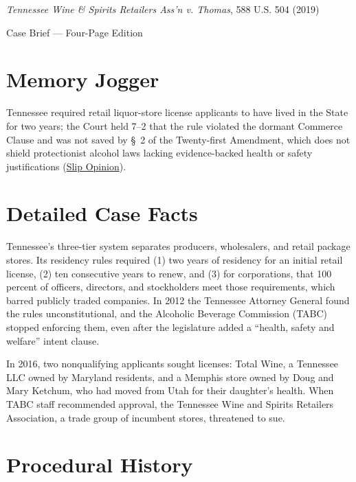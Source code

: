 \documentclass[12pt]{article}
\begin{document}
\begin{center}
{\LARGE \textit{Tennessee Wine \& Spirits Retailers Ass'n v. Thomas}, 588 U.S. 504 (2019)\par}
\vspace{0.8em}
{\large Case Brief --- Four-Page Edition\par}
\end{center}
\vspace{1em}

\section{Memory Jogger}

Tennessee required retail liquor-store license applicants to have lived in the State for two years; the Court held 7--2 that the rule violated the dormant Commerce Clause and was not saved by \S~2 of the Twenty-first Amendment, which does not shield protectionist alcohol laws lacking evidence-backed health or safety justifications (\href{https://www.supremecourt.gov/opinions/18pdf/18-96_5i36.pdf}{Slip Opinion}).

\section{Detailed Case Facts}

Tennessee's three-tier system separates producers, wholesalers, and retail package stores. Its residency rules required (1) two years of residency for an initial retail license, (2) ten consecutive years to renew, and (3) for corporations, that 100 percent of officers, directors, and stockholders meet those requirements, which barred publicly traded companies. In 2012 the Tennessee Attorney General found the rules unconstitutional, and the Alcoholic Beverage Commission (TABC) stopped enforcing them, even after the legislature added a ``health, safety and welfare'' intent clause.

In 2016, two nonqualifying applicants sought licenses: Total Wine, a Tennessee LLC owned by Maryland residents, and a Memphis store owned by Doug and Mary Ketchum, who had moved from Utah for their daughter's health. When TABC staff recommended approval, the Tennessee Wine and Spirits Retailers Association, a trade group of incumbent stores, threatened to sue.

\section{Procedural History}
\end{document}
